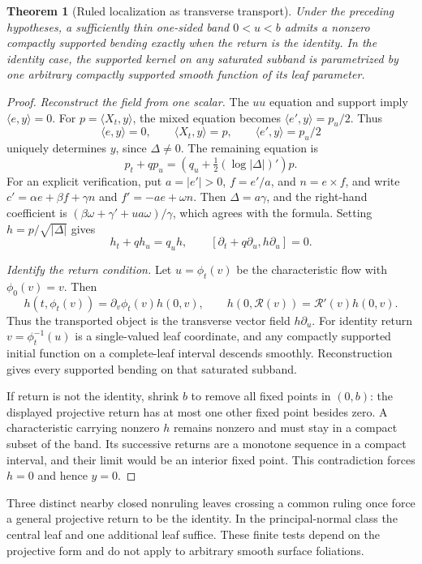 \documentclass[11pt]{amsart}
\newtheorem{theorem}{Theorem}[section]
\theoremstyle{definition}
\theoremstyle{remark}
\numberwithin{equation}{section}
\begin{document}
\begin{theorem}[Ruled localization as transverse transport]
\label{thm:general-ruled-kernel}
Under the preceding hypotheses, a sufficiently thin one-sided band
$0<u<b$ admits a nonzero compactly supported bending exactly when the
return is the identity. In the identity case, the supported kernel on
any saturated subband is parametrized by one arbitrary compactly supported
smooth function of its leaf parameter.
\end{theorem}
\begin{proof}
\emph{Reconstruct the field from one scalar.}
The $uu$ equation and support imply $\langle e,y\rangle=0$.
For $p=\langle X_t,y\rangle$, the mixed equation becomes
$\langle e',y\rangle=p_u/2$. Thus
\begin{equation}\label{eq:general-bending-reconstruction}
 \langle e,y\rangle=0,\qquad \langle X_t,y\rangle=p,
 \qquad\langle e',y\rangle=p_u/2
\end{equation}
uniquely determines $y$, since $\Delta\ne0$. The remaining equation is
\[
 p_t+qp_u=\left(q_u+\tfrac12(\log|\Delta|)'\right)p.
\]
For an explicit verification, put $a=|e'|>0$, $f=e'/a$, and
$n=e\times f$, and write $c'=\alpha e+\beta f+\gamma n$ and
$f'=-ae+\omega n$.
Then $\Delta=a\gamma$, and the right-hand coefficient is
$(\beta\omega+\gamma'+ua\omega)/\gamma$, which agrees with the formula.
Setting $h=p/\sqrt{|\Delta|}$ gives
\begin{equation}\label{eq:transverse-vector-transport}
 h_t+qh_u=q_uh,
 \qquad[\partial_t+q\partial_u,h\partial_u]=0.
\end{equation}

\emph{Identify the return condition.}
Let $u=\phi_t(v)$ be the characteristic flow with $\phi_0(v)=v$.
Then
\[
 h(t,\phi_t(v))=\partial_v\phi_t(v)h(0,v),\qquad
 h(0,\mathcal R(v))=\mathcal R'(v)h(0,v).
\]
Thus the transported object is the transverse vector field $h\partial_u$.
For identity return $v=\phi_t^{-1}(u)$ is a single-valued leaf coordinate,
and any compactly supported initial function on a
complete-leaf interval descends smoothly. Reconstruction gives every
supported bending on that saturated subband.

If return is not the identity, shrink $b$ to remove all fixed points in
$(0,b)$: the displayed projective return has at most one other fixed
point besides zero. A characteristic carrying nonzero $h$ remains nonzero
and must stay in a compact subset of the band. Its successive returns
are a monotone sequence in a compact interval, and their limit would be
an interior fixed point. This contradiction forces $h=0$ and hence $y=0$.
\end{proof}
Three distinct nearby closed nonruling leaves crossing a common ruling
once force a general projective return to be the identity. In the
principal-normal class the central leaf and one additional leaf suffice.
These finite tests depend on the projective form and do not apply to
arbitrary smooth surface foliations.
\end{document}
